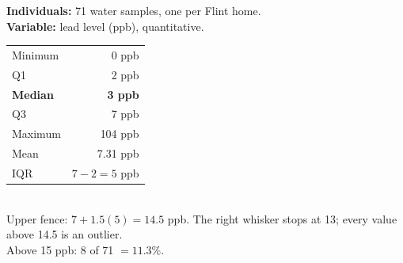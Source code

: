 \documentclass[12pt]{article}
\begin{document}
\vspace{4pt}
\noindent
\begin{minipage}[t]{0.34\linewidth}
\begin{tcolorbox}[enhanced,colback=calloutgreen,colframe=black!55,boxrule=0.7pt,arc=2pt,title={\textbf{DATA}},coltitle=black,fonttitle=\bfseries]
\textbf{Individuals:} 71 water samples, one per Flint home.\\
\textbf{Variable:} lead level (ppb), quantitative.\\[4pt]
\begin{tabular}{lr}
Minimum & 0 ppb \\
Q1 & 2 ppb \\
\textbf{Median} & \textbf{3 ppb} \\
Q3 & 7 ppb \\
Maximum & 104 ppb \\ \hline
Mean & 7.31 ppb \\
IQR & $7 - 2 = 5$ ppb \\
\end{tabular}\\[4pt]
Upper fence: $7 + 1.5(5) = 14.5$ ppb. The right whisker stops at 13; every value above 14.5 is an outlier.\\
Above 15 ppb: 8 of 71 $= 11.3\%$.
\end{tcolorbox}
\end{minipage}\hfill
\end{document}
